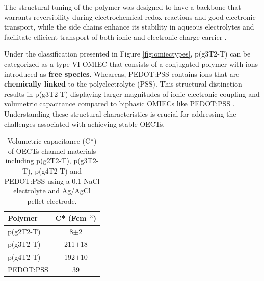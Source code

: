 The structural tuning of the polymer was designed to have a backbone that warrants reversibility during electrochemical redox reactions and good electronic transport, while the side chains enhance its stability in aqueous electrolytes and facilitate efficient transport of both ionic and electronic charge carrier \cite{moiaDesignEvaluationConjugated2019}. 



Under the classification presented in Figure \ref{fig:omiectypes}, p(g3T2-T) can be categorized as a type VI OMIEC that consists of a conjugated polymer with ions introduced as \textbf{free species}. Wheareas, PEDOT:PSS contains ions that are \textbf{chemically linked} to the polyelectrolyte (PSS). This structural distinction results in p(g3T2-T) displaying larger magnitudes of ionic-electronic coupling and volumetric capacitance compared to biphasic OMIECs like PEDOT:PSS \cite{paulsenOrganicMixedIonic2020}. Understanding these structural characteristics is crucial for addressing the challenges associated with achieving stable OECTs.%

\begin{table}[h]
	\centering
	\caption[Volumetric capacitance (C*) of various OECTs channel materials]{Volumetric capacitance (C*) of OECTs channel materials including p(g2T2-T), p(g3T2-T), p(g4T2-T) \cite{moserEthyleneGlycolBasedSide2020} and PEDOT:PSS \cite{inalBenchmarkingOrganicMixed2017} using a 0.1 NaCl electrolyte and Ag/AgCl pellet electrode.}
	\begin{tabular}{l c} \hline
		Polymer	&  C* (Fcm$^{-3}$) \\ \hline
		p(g2T2-T) & 8$\pm$2 \\
		p(g3T2-T) & 211$\pm$18 \\
		p(g4T2-T) & 192$\pm$10 \\  
		PEDOT:PSS & 39 \\\hline
	\end{tabular}
	\label{tab:perf}
\end{table}


